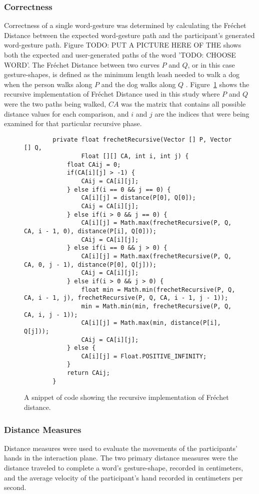 \subsubsection{Correctness}
Correctness of a single word-gesture was determined by calculating the Fr\'echet Distance between the expected word-gesture path and the participant's generated word-gesture path. Figure TODO: PUT A PICTURE HERE OF THE shows both the expected and user-generated paths of the word 'TODO: CHOOSE WORD'. The Fr\'echet Distance between two curves $P$ and $Q$, or in this case gesture-shapes, is defined as the minimum length leash needed to walk a dog when the person walks along $P$ and the dog walks along $Q$ \cite{Har-Peled2014}. Figure~\ref{code_frechet} shows the recursive implementation of Fr\'echet Distance used in this study where $P$ and $Q$ were the two paths being walked, $CA$ was the matrix that contains all possible distance values for each comparison, and $i$ and $j$ are the indices that were being examined for that particular recursive phase.

\begin{figure}[h] %
	\centering
	\begin{lstlisting}
        private float frechetRecursive(Vector [] P, Vector [] Q,
		        Float [][] CA, int i, int j) {
	        float CAij = 0;
	        if(CA[i][j] > -1) {
		        CAij = CA[i][j];
	        } else if(i == 0 && j == 0) {
		        CA[i][j] = distance(P[0], Q[0]);
		        CAij = CA[i][j];
	        } else if(i > 0 && j == 0) {
		        CA[i][j] = Math.max(frechetRecursive(P, Q, CA, i - 1, 0), distance(P[i], Q[0]));
		        CAij = CA[i][j];
	        } else if(i == 0 && j > 0) {
		        CA[i][j] = Math.max(frechetRecursive(P, Q, CA, 0, j - 1), distance(P[0], Q[j]));
		        CAij = CA[i][j];
	        } else if(i > 0 && j > 0) {
		        float min = Math.min(frechetRecursive(P, Q, CA, i - 1, j), frechetRecursive(P, Q, CA, i - 1, j - 1));
		        min = Math.min(min, frechetRecursive(P, Q, CA, i, j - 1));
		        CA[i][j] = Math.max(min, distance(P[i], Q[j]));
		        CAij = CA[i][j];
	        } else {
		        CA[i][j] = Float.POSITIVE_INFINITY;
	        }
	        return CAij;
        }
	\end{lstlisting}
	\caption[Fr\'echet Distance code snippet]{A snippet of code showing the recursive implementation of Fr\'echet distance.}
	\label{code_frechet}
\end{figure}  

\subsubsection{Distance Measures}
Distance measures were used to evaluate the movements of the participants' hands in the interaction plane. The two primary distance measures were the distance traveled to complete a word's gesture-shape, recorded in centimeters, and the average velocity of the participant's hand recorded in centimeters per second.

